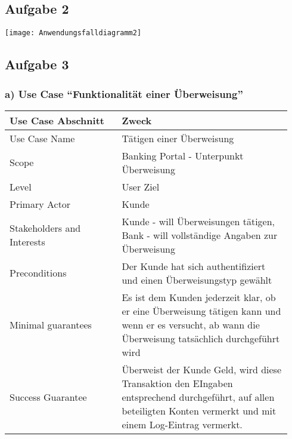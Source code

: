 \documentclass[a4paper,10pt]{article}
\begin{document}
\subsection*{Aufgabe 2}
\texttt{[image: Anwendungsfalldiagramm2]}
\subsection*{Aufgabe 3}
\subsubsection*{a) Use Case ``Funktionalität einer Überweisung''}
\begin{tabular}{|p{0.37\linewidth}|p{0.57\linewidth}|}
\hline
\textbf{Use Case Abschnitt} & \textbf{Zweck} \\
\hline
Use Case Name & Tätigen einer Überweisung\\
\hline
Scope & Banking Portal \-- Unterpunkt Überweisung \\
\hline
Level & User Ziel\\
\hline
Primary Actor & Kunde\\
\hline
Stakeholders and Interests & Kunde \-- will Überweisungen tätigen, Bank \-- will vollständige Angaben zur Überweisung\\
\hline
Preconditions & Der Kunde hat sich authentifiziert und einen Überweisungstyp gewählt\\
\hline
Minimal guarantees & Es ist dem Kunden jederzeit klar, ob er eine Überweisung tätigen kann und wenn er es versucht, ab wann die Überweisung tatsächlich durchgeführt wird\\
\hline
Success Guarantee & Überweist der Kunde Geld, wird diese Transaktion den EIngaben entsprechend durchgeführt, auf allen beteiligten Konten vermerkt und mit einem Log-Eintrag vermerkt.\\
\hline

\end{tabular}
\end{document}
